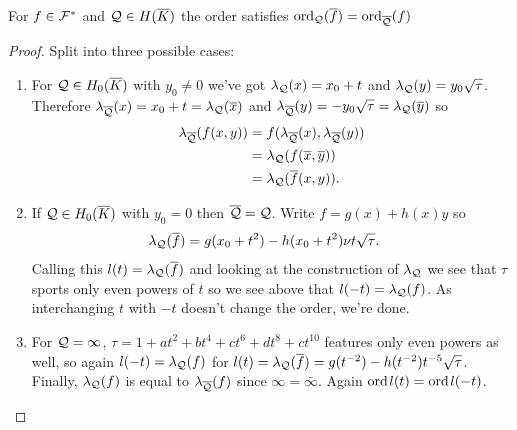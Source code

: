 \documentclass[english,11pt,a4paper]{article}
\begin{document}
\begin{lemma}\label{three}
  For $f \in \mathcal{F}^*$ and $\mathcal{Q} \in H(\overline K)$ the order satisfies $\text{ord}_{\mathcal{Q}}(\overline f) = \text{ord}_{\overline {\mathcal{Q}}} (f)$
  \begin{proof} Split into three possible cases:
    \begin{enumerate}[1.]
    	\item For $\mathcal{Q} \in H_0(\overline K)$ with $y_0 \neq 0$ we've got $\lambda_{\mathcal{Q}}(x) = x_0 + t$ and $\lambda_{\mathcal{Q}}(y) = y_0 \sqrt \tau$. Therefore $\lambda_{\overline {\mathcal{Q}}}(x) = x_0 + t = \lambda_{\mathcal{Q}} (\overline x)$ and $\lambda_{\overline {\mathcal{Q}}}(y) = - y_0 \sqrt \tau = \lambda_{\mathcal{Q}} (\overline y)$ so
    	\begin{align*}
    	  \lambda_{\overline {\mathcal{Q}}} (f(x,y)) &= f(\lambda_{\overline {\mathcal{Q}}}(x) , \lambda_{\overline {\mathcal{Q}}}(y) ) \\
    	  							&= \lambda_{\mathcal{Q}} (f(\overline x, \overline y)) \\
    	  							&= \lambda_{\mathcal{Q}} (\overline f (x,y)).
    	\end{align*}

    	\item If $\mathcal{Q} \in H_0(\overline K)$ with $y_0 = 0$ then $\overline {\mathcal{Q}} = \mathcal{Q}$. Write $f = g(x) + h(x)y$ so
    	\begin{align*}
    	  \lambda_{\mathcal{Q}} (\overline f) &= g(x_0 + t^2) - h(x_0 + t^2) \nu t \sqrt{\tau}.
    	\end{align*}
    	Calling this $l(t) = \lambda_{\mathcal{Q}} (\overline f)$ and looking at the construction of $\lambda_{\mathcal{Q}}$ we see that $\tau$ sports only even powers of $t$ so we see above that $l(-t) = \lambda_{\mathcal{Q}} (f)$. As interchanging $t$ with $-t$ doesn't change the order, we're done.

    	\item For $\mathcal{Q} = \infty$, $\tau = 1 + a t^2 + b t^4 + c t^6 + d t^8 + c t^{10}$ features only even powers as well, so again $l(-t) = \lambda_{\mathcal{Q}} (f)$ for $l(t) = \lambda_{\mathcal{Q}} (\overline f) = g(t^{-2}) - h(t^{-2}) t^{-5} \sqrt{\tau}$. Finally, $\lambda_{\mathcal{Q}} (f)$ is equal to $\lambda_{\overline {\mathcal{Q}}} (f)$ since $\infty = \bar \infty$. Again $\text{ord\hspace{0.4mm}} l(t) = \text{ord\hspace{0.4mm}} l(-t)$.
    \end{enumerate}
  \end{proof}
\end{lemma}
\end{document}
